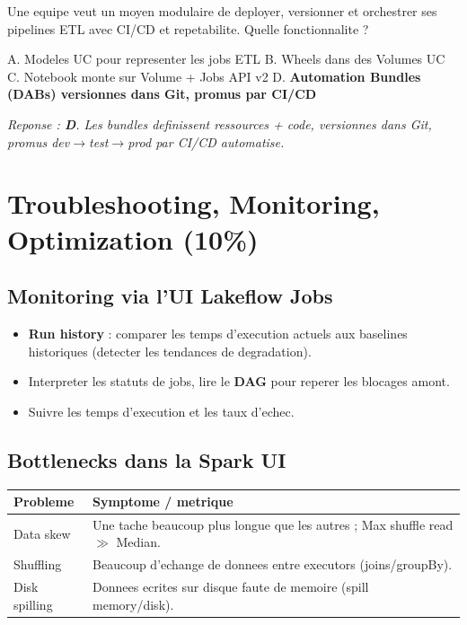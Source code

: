 \documentclass[11pt,a4paper]{article}
\begin{document}
\begin{qcm}
Une equipe veut un moyen modulaire de deployer, versionner et orchestrer ses pipelines ETL
avec CI/CD et repetabilite. Quelle fonctionnalite ?

\smallskip
A. Modeles UC pour representer les jobs ETL \hfill
B. Wheels dans des Volumes UC \\
C. Notebook monte sur Volume + Jobs API v2 \hfill
D. \textbf{Automation Bundles (DABs) versionnes dans Git, promus par CI/CD}

\smallskip
\textit{Reponse : \textbf{D}. Les bundles definissent ressources + code, versionnes dans Git,
promus dev$\to$test$\to$prod par CI/CD automatise.}
\end{qcm}

\section{Troubleshooting, Monitoring, Optimization (10\%)}

\subsection{Monitoring via l'UI Lakeflow Jobs}

\begin{itemize}[leftmargin=*,nosep]
  \item \textbf{Run history} : comparer les temps d'execution actuels aux baselines historiques
  (detecter les tendances de degradation).
  \item Interpreter les statuts de jobs, lire le \textbf{DAG} pour reperer les blocages amont.
  \item Suivre les temps d'execution et les taux d'echec.
\end{itemize}

\subsection{Bottlenecks dans la Spark UI}

\begin{center}
\renewcommand{\arraystretch}{1.3}
\begin{tabular}{@{}p{3.5cm}p{11cm}@{}}
\toprule
\textbf{Probleme} & \textbf{Symptome / metrique} \\
\midrule
Data skew & Une tache beaucoup plus longue que les autres ; Max shuffle read $\gg$ Median. \\
Shuffling & Beaucoup d'echange de donnees entre executors (joins/groupBy). \\
Disk spilling & Donnees ecrites sur disque faute de memoire (spill memory/disk). \\
\bottomrule
\end{tabular}
\end{center}
\end{document}
